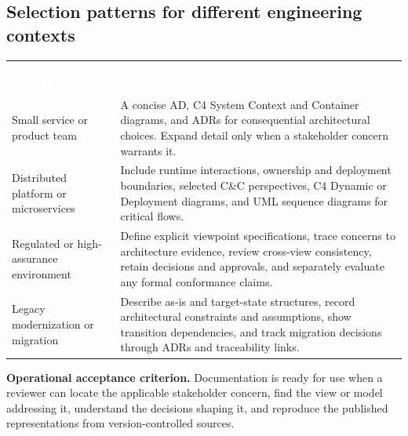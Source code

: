 \documentclass[11pt,letterpaper,oneside]{article}
\newcommand{\thead}[1]{\textcolor{white}{\bfseries #1}}
\begin{document}
\subsection{Selection patterns for different engineering contexts}
\small
{}
\begin{tabularx}{\textwidth}{@{}L{0.24\textwidth}Y@{}}
\thead{Engineering context} & \thead{Practical documentation baseline}\\
Small service or product team & A concise AD, C4 System Context and Container diagrams, and ADRs for consequential architectural choices. Expand detail only when a stakeholder concern warrants it.\\
Distributed platform or microservices & Include runtime interactions, ownership and deployment boundaries, selected C\&C perspectives, C4 Dynamic or Deployment diagrams, and UML sequence diagrams for critical flows.\\
Regulated or high-assurance environment & Define explicit viewpoint specifications, trace concerns to architecture evidence, review cross-view consistency, retain decisions and approvals, and separately evaluate any formal conformance claims.\\
Legacy modernization or migration & Describe as-is and target-state structures, record architectural constraints and assumptions, show transition dependencies, and track migration decisions through ADRs and traceability links.\\
\end{tabularx}
\normalsize

\begin{notebox}
\textbf{Operational acceptance criterion.} Documentation is ready for use when a reviewer can locate the applicable stakeholder concern, find the view or model addressing it, understand the decisions shaping it, and reproduce the published representations from version-controlled sources.
\end{notebox}

\clearpage
\end{document}
